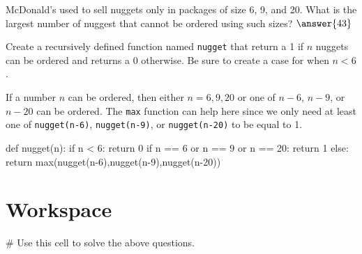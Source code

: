 \documentclass{ximera}
\begin{document}
\begin{question}
McDonald's used to sell nuggets only in packages of size 6, 9, and 20. What is the largest number of nuggest that cannot be ordered using such sizes? $\answer{43}$
	\begin{hint}
Create a recursively defined function named \verb|nugget| that return a 1 if $n$ nuggets can be ordered and returns a 0 otherwise. Be sure to create a case for when $n<6$.
	\end{hint}
	\begin{hint}
	If a number $n$ can be ordered, then either $n=6,9,20$ or one of $n-6$, $n-9$, or $n-20$ can be ordered. The \verb|max| function can help here since we only need at least one of \verb|nugget(n-6)|, \verb|nugget(n-9)|, or \verb|nugget(n-20)| to be equal to 1.
	\end{hint}
\begin{hint}
\begin{sageCell}
def nugget(n):
        if n < 6:
                return 0
        if n == 6 or n == 9 or n == 20:
                return 1
        else:
                return max(nugget(n-6),nugget(n-9),nugget(n-20))
\end{sageCell}
	\end{hint}
\end{question}

\section{Workspace}

\begin{sageCell}
# Use this cell to solve the above questions.
\end{sageCell}
\end{document}
